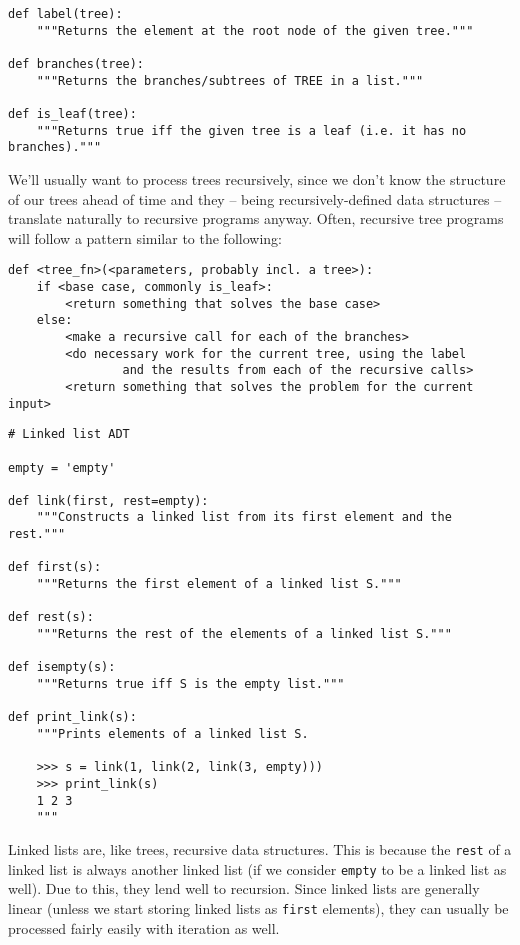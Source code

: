 \documentclass[twoside]{article}
\begin{document}
\begin{enumerate}
\begin{lstlisting}
def label(tree):
    """Returns the element at the root node of the given tree."""

def branches(tree):
    """Returns the branches/subtrees of TREE in a list."""

def is_leaf(tree):
    """Returns true iff the given tree is a leaf (i.e. it has no branches)."""
\end{lstlisting}

We'll usually want to process trees recursively, since we don't know the structure of our trees ahead of time and they -- being recursively-defined data structures -- translate naturally to recursive programs anyway. Often, recursive tree programs will follow a pattern similar to the following:

\begin{lstlisting}
def <tree_fn>(<parameters, probably incl. a tree>):
    if <base case, commonly is_leaf>:
        <return something that solves the base case>
    else:
        <make a recursive call for each of the branches>
        <do necessary work for the current tree, using the label
                and the results from each of the recursive calls>
        <return something that solves the problem for the current input>
\end{lstlisting}


\begin{lstlisting}
# Linked list ADT

empty = 'empty'

def link(first, rest=empty):
    """Constructs a linked list from its first element and the rest."""

def first(s):
    """Returns the first element of a linked list S."""

def rest(s):
    """Returns the rest of the elements of a linked list S."""

def isempty(s):
    """Returns true iff S is the empty list."""

def print_link(s):
    """Prints elements of a linked list S.

    >>> s = link(1, link(2, link(3, empty)))
    >>> print_link(s)
    1 2 3
    """
\end{lstlisting}

Linked lists are, like trees, recursive data structures. This is because the \texttt{rest} of a linked list is always another linked list (if we consider \texttt{empty} to be a linked list as well). Due to this, they lend well to recursion. Since linked lists are generally linear (unless we start storing linked lists as \texttt{first} elements), they can usually be processed fairly easily with iteration as well.


\end{enumerate}
\end{document}
